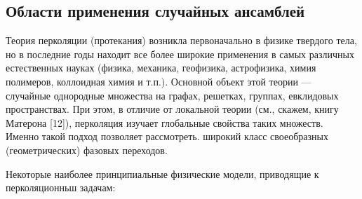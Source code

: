\subsection{Области применения случайных ансамблей}

Теория перколяции (протекания) возникла первоначально в физике твердого тела, но в последние годы находит все более широкие применения в самых различных естественных науках (физика, механика, геофизика, астрофизика, химия полимеров, коллоидная химия и т.п.). Основной объект этой теории — случайные однородные множества на графах, решетках, группах, евклидовых пространствах. При этом, в отличие от локальной теории (см., скажем, книгу Матерона [12]), перколяция изучает глобальные свойства таких множеств. Именно такой подход позволяет рассмотреть. широкий класс своеобразных (геометрических) фазовых переходов.

Некоторые наиболее принципиальные физические модели, приводящие к перколяционньш задачам:

